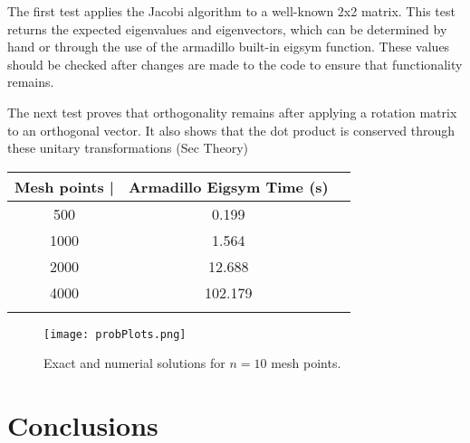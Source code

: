 \documentclass[10pt,showpacs,preprintnumbers,footinbib,amsmath,amssymb,aps,prl,twocolumn,groupedaddress,superscriptaddress,showkeys]{revtex4-1}
\begin{document}
\quad The first test applies the Jacobi algorithm to a well-known 2x2 matrix. This test returns the expected eigenvalues and eigenvectors, which can be determined by hand or through the use of the armadillo built-in eigsym function. These values should be checked after changes are made to the code to ensure that functionality remains.

\quad The next test proves that orthogonality remains after applying a rotation matrix to an orthogonal vector. It also shows that the dot product is conserved through these unitary transformations (Sec Theory)

\begin{center}
		\begin{tabular}{ccc}
			\hline \hline
			Mesh points |\quad & Armadillo Eigsym Time (s) \\
			\hline		
			500 & 0.199  \\
			1000 & 1.564  \\
			2000 & 12.688  \\
			4000 &  102.179\\
			\hline
			\label{timingtable}
		\end{tabular}
	\end{center}
	
\begin{widetext}
\begin{figure}[hbtp]
\texttt{[image: probPlots.png]}
\caption{Exact and numerial solutions for $n=10$ mesh points.} 
\label{probability}
\end{figure}
\end{widetext}

\section{Conclusions}

\end{document}
